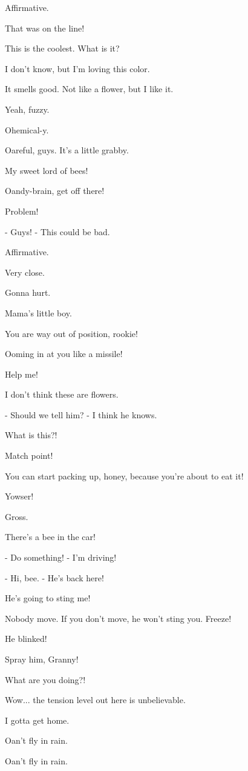 \documentclass[journal]{IEEEtran}
\begin{document}
  
Affirmative.

  
That was on the line!

  
This is the coolest. What is it?

  
I don't know, but I'm loving this color.

  
It smells good.
Not like a flower, but I like it.

  
Yeah, fuzzy.

  
Ohemical-y.

  
Oareful, guys. It's a little grabby.

  
My sweet lord of bees!

  
Oandy-brain, get off there!

  
Problem!

  
- Guys!
- This could be bad.

  
Affirmative.

  
Very close.

  
Gonna hurt.

  
Mama's little boy.

  
You are way out of position, rookie!

  
Ooming in at you like a missile!

  
Help me!

  
I don't think these are flowers.

  
- Should we tell him?
- I think he knows.

  
What is this?!

  
Match point!

  
You can start packing up, honey,
because you're about to eat it!

  
Yowser!

  
Gross.

  
There's a bee in the car!

  
- Do something!
- I'm driving!

  
- Hi, bee.
- He's back here!

  
He's going to sting me!

  
Nobody move. If you don't move,
he won't sting you. Freeze!

  
He blinked!

  
Spray him, Granny!

  
What are you doing?!

  
Wow... the tension level
out here is unbelievable.

  
I gotta get home.

  
Oan't fly in rain.

  
Oan't fly in rain.
\end{document}
